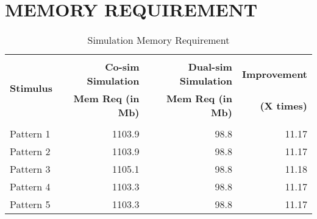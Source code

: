\section{MEMORY REQUIREMENT}
\begin{table}[h!]
\begin{center}
\caption{Simulation Memory Requirement}
\label{tab:Memory Requirement}
\vspace{0.2cm}
\begin{tabular}{|l|r|r|r|}
\hline
\multirow{3}{*}{\bf Stimulus} & &	&\\ & {\bf Co-sim Simulation} 	& {\bf Dual-sim Simulation} & {\bf Improvement } 	\\ & \bf{Mem Req (in Mb)}  &  {\bf{Mem Req (in Mb)}} &  {\bf(X times) }\\



						&				&				&				\\
\hline
Pattern 1 			&1103.9				&98.8				&11.17 				\\

Pattern 2  				&1103.9				&98.8				&11.17				\\

Pattern 3  		&1105.1				&98.8				&11.18				\\

Pattern 4  			&1103.3			&98.8 				&11.17				\\

Pattern 5  				&1103.3				&98.8				&11.17				\\
\hline


\end{tabular}
\end{center}

\end{table}

